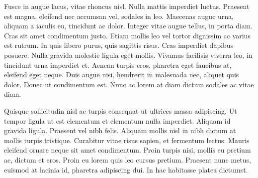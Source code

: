 Fusce in augue lacus, vitae rhoncus nisl. Nulla mattis imperdiet luctus. Praesent est magna, eleifend nec accumsan vel, sodales in leo. Maecenas augue urna, aliquam a iaculis eu, tincidunt ac dolor. Integer vitae augue tellus, in porta diam. Cras sit amet condimentum justo. Etiam mollis leo vel tortor dignissim ac varius est rutrum. In quis libero purus, quis sagittis risus. Cras imperdiet dapibus posuere. Nulla gravida molestie ligula eget mollis. Vivamus facilisis viverra leo, in tincidunt urna imperdiet et. Aenean turpis eros, pharetra eget faucibus at, eleifend eget neque. Duis augue nisi, hendrerit in malesuada nec, aliquet quis dolor. Donec ut condimentum est. Nunc ac lorem at diam dictum sodales ac vitae diam.

Quisque sollicitudin nisl ac turpis consequat ut ultrices massa adipiscing. Ut tempor ligula ut est elementum et elementum nulla imperdiet. Aliquam id gravida ligula. Praesent vel nibh felis. Aliquam mollis nisl in nibh dictum at mollis turpis tristique. Curabitur vitae risus sapien, et fermentum lectus. Mauris eleifend ornare neque sit amet condimentum. Proin turpis nisi, mollis eu pretium ac, dictum et eros. Proin eu lorem quis leo cursus pretium. Praesent nunc metus, euismod at lacinia id, pharetra adipiscing dui. In hac habitasse platea dictumst.
